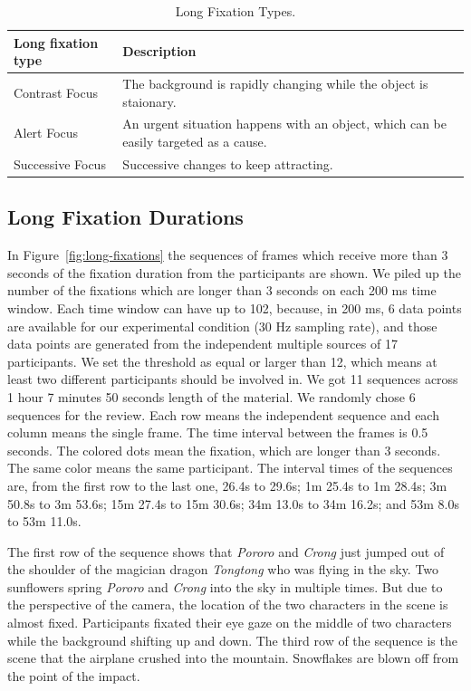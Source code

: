 \documentclass[10pt,letterpaper]{article}
\begin{document}
\begin{table}[!ht]
\begin{center} 
\caption{Long Fixation Types.} 
\label{long-fixation-types} 
\vskip 0.12in
\begin{tabular}{ll} 
\hline
Long fixation type    &  Description \\
\hline
Contrast Focus        &   The background is rapidly changing while the object 
                          is staionary. \\
Alert Focus           &   An urgent situation happens with an object, which can 
                          be easily targeted as a cause. \\
Successive Focus      &   Successive changes to keep attracting. \\
\hline
\end{tabular} 
\end{center} 
\end{table}

\subsection{Long Fixation Durations}

In Figure~\ref{fig:long-fixations} the sequences of frames which receive more than 3 seconds of the fixation duration from the participants are shown. We piled up the number of the fixations which are longer than 3 seconds on each 200 ms time window. Each time window can have up to 102, because, in 200 ms, 6 data points are available for our experimental condition (30 Hz sampling rate), and those data points are generated from the independent multiple sources of 17 participants. We set the threshold as equal or larger than 12, which means at least two different participants should be involved in. We got 11 sequences across 1 hour 7 minutes 50 seconds length of the material. We randomly chose 6 sequences for the review. Each row means the independent sequence and each column means the single frame. The time interval between the frames is 0.5 seconds. The colored dots mean the fixation, which are longer than 3 seconds. The same color means the same participant. The interval times of the sequences are, from the first row to the last one, 26.4s to 29.6s; 1m 25.4s to 1m 28.4s; 3m 50.8s to 3m 53.6s; 15m 27.4s to 15m 30.6s; 34m 13.0s to 34m 16.2s; and 53m 8.0s to 53m 11.0s.

The first row of the sequence shows that \textit{Pororo} and \textit{Crong} just jumped out of the shoulder of the magician dragon \textit{Tongtong} who was flying in the sky. Two sunflowers spring \textit{Pororo} and \textit{Crong} into the sky in multiple times. But due to the perspective of the camera, the location of the two characters in the scene is almost fixed. Participants fixated their eye gaze on the middle of two characters while the background shifting up and down. The third row of the sequence is the scene that the airplane crushed into the mountain. Snowflakes are blown off from the point of the impact.
\end{document}
